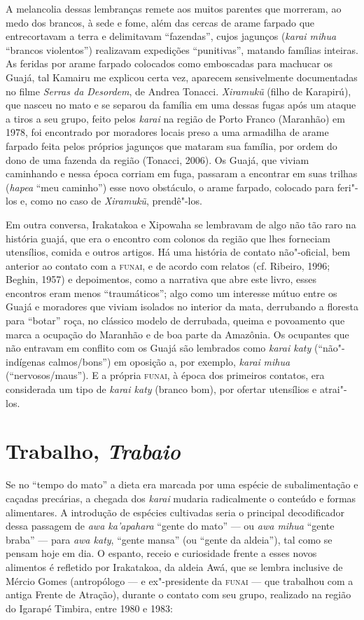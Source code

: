 A melancolia dessas lembranças remete aos muitos parentes que morreram,
ao medo dos brancos, à sede e fome, além das cercas de arame farpado que
entrecortavam a terra e delimitavam ``fazendas'', cujos jagunços
(\emph{karai mihua} ``brancos violentos'') realizavam expedições
``punitivas'', matando famílias inteiras. As feridas por arame farpado
colocados como emboscadas para machucar os Guajá, tal Kamairu me
explicou certa vez, aparecem sensivelmente documentadas no filme
\emph{Serras da Desordem}, de Andrea Tonacci. \emph{Xiramukũ} (filho de
Karapirú), que nasceu no mato e se separou da família em uma dessas
fugas após um ataque a tiros a seu grupo, feito pelos \emph{karai} na
região de Porto Franco (Maranhão) em 1978, foi encontrado por moradores
locais preso a uma armadilha de arame farpado feita pelos próprios
jagunços que mataram sua família, por ordem do dono de uma fazenda da
região (Tonacci, 2006). Os Guajá, que viviam caminhando e nessa época
corriam em fuga, passaram a encontrar em suas trilhas (\emph{hapea}
``meu caminho'') esse novo obstáculo, o arame farpado, colocado para
feri"-los e, como no caso de \emph{Xiramukũ}, prendê"-los.

Em outra conversa, Irakatakoa e Xipowaha se lembravam de algo não tão
raro na história guajá, que era o encontro com colonos da região que
lhes forneciam utensílios, comida e outros artigos. Há uma história de
contato não"-oficial, bem anterior ao contato com a \textsc{funai}, e de acordo
com relatos (cf. Ribeiro, 1996; Beghin, 1957) e depoimentos, como a
narrativa que abre este livro, esses encontros eram menos ``traumáticos'';
algo como um interesse mútuo entre os Guajá e moradores que viviam
isolados no interior da mata, derrubando a floresta para ``botar'' roça,
no clássico modelo de derrubada, queima e povoamento que marca a
ocupação do Maranhão e de boa parte da Amazônia. Os ocupantes que não
entravam em conflito com os Guajá são lembrados como \emph{karai katy}
(``não"-indígenas calmos/bons'') em oposição a, por exemplo, \emph{karai}
\emph{mihua} (``nervosos/maus''). E a própria \textsc{funai}, à época dos
primeiros contatos, era considerada um tipo de \emph{karai katy} (branco
bom), por ofertar utensílios e atrai"-los.

\section{Trabalho, \emph{Trabaio}}

Se no ``tempo do mato'' a dieta era marcada por uma espécie de
subalimentação e caçadas precárias, a chegada dos \emph{karai} mudaria
radicalmente o conteúdo e formas alimentares. A introdução de espécies
cultivadas seria o principal decodificador dessa passagem de \emph{awa
ka'apahara} ``gente do mato'' --- ou \emph{awa mihua} ``gente braba'' ---
para \emph{awa katy}, ``gente mansa'' (ou ``gente da aldeia''), tal como
se pensam hoje em dia. O espanto, receio e curiosidade frente a esses
novos alimentos é refletido por Irakatakoa, da aldeia Awá, que se
lembra inclusive de Mércio Gomes (antropólogo --- e ex"-presidente da \textsc{funai}
--- que trabalhou com a antiga Frente de Atração), durante o contato com
seu grupo, realizado na região do Igarapé Timbira, entre 1980 e 1983:

